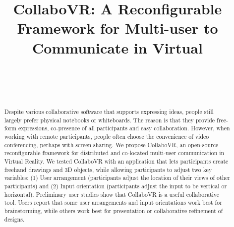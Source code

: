 \documentclass{sigchi}
\def\plaintitle{CollaboVR: A Reconfigurable Framework for Multi-user to Communicate in Virtual}
\begin{document}
\title{\plaintitle}

\author{%
  \\
  \\
  \\
}

 
\maketitle

\begin{abstract}
  Despite various collaborative software that supports expressing ideas, people still largely prefer physical notebooks or whiteboards. The reason is that they provide free-form expressions, co-presence of all participants and easy collaboration. However, when working with remote participants, people often choose the convenience of video conferencing, perhaps with screen sharing. We propose CollaboVR, an open-source reconfigurable framework for distributed and co-located multi-user communication in Virtual Reality. We tested CollaboVR with an application that lets participants create freehand drawings and 3D objects, while allowing participants to adjust two key variables: (1) User arrangement (participants adjust the location of their views of other participants) and (2) Input orientation (participants adjust the input to be vertical or horizontal). Preliminary user studies show that CollaboVR is a useful collaborative tool. Users report that some user arrangements and input orientations work best for brainstorming, while others work best for presentation or collaborative refinement of designs.
\end{abstract}
\end{document}
